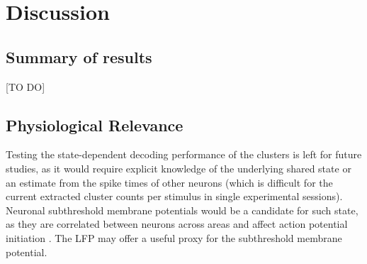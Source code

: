 \documentclass{article}
\begin{document}





\section{Discussion}

\subsection*{Summary of results}
[TO DO]


\subsection*{Physiological Relevance}
Testing the state-dependent decoding performance of the clusters is left for future studies, as it would require explicit knowledge of the underlying shared state or an estimate from the spike times of other neurons (which is difficult for the current extracted cluster counts per stimulus in single experimental sessions).
Neuronal subthreshold membrane potentials would be a candidate for such state, as they are correlated between neurons across areas \cite{poulet2008internal} and affect action potential initiation \cite{petersen2003interaction}. The LFP may offer a useful proxy for the subthreshold membrane potential.
\end{document}
